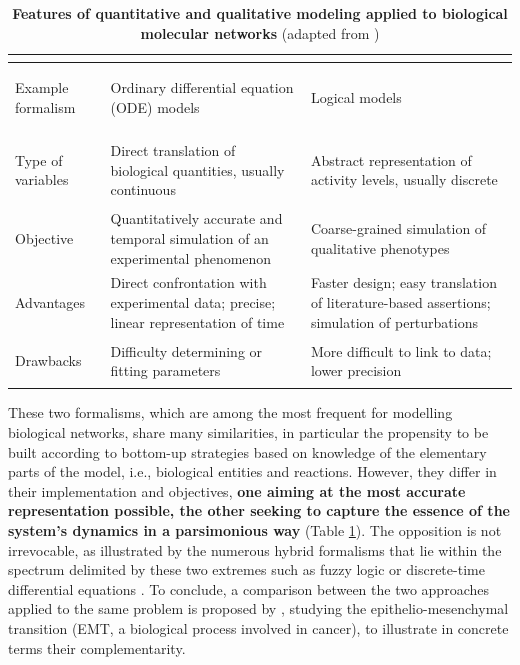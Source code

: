 \documentclass[a4paper,12pt,twoside,onecolumn,openright,final,oldfontcommands]{memoir}
\begin{document}
\begin{table}

\caption{\label{tab:odelogic}\textbf{Features of quantitative and qualitative
modeling applied to biological molecular networks} (adapted from
\citet{le2015quantitative})}
\centering
\begin{tabular}[t]{>{\bfseries\raggedright\arraybackslash}p{6em}||>{\raggedright\arraybackslash}p{12em}|>{\raggedright\arraybackslash}p{12em}}
\hline
\rowcolor[HTML]{808080}  \multicolumn{1}{c}{\textcolor{white}{\textbf{ }}} & \multicolumn{1}{c}{\textcolor{white}{\textbf{Quantitative modeling}}} & \multicolumn{1}{c}{\textcolor{white}{\textbf{Qualitative modeling}}}\\
\hline
Example formalism & Ordinary differential equation (ODE) models & Logical models\\
\hline
Type of variables & Direct translation of biological quantities, usually continuous & Abstract representation of activity levels, usually discrete\\
\hline
Objective & Quantitatively accurate and temporal simulation of an experimental phenomenon & Coarse-grained simulation of qualitative phenotypes\\
\hline
Advantages & Direct confrontation with experimental data; precise; linear representation of time & Faster design; easy translation of literature-based assertions; simulation of perturbations\\
\hline
Drawbacks & Difficulty determining or fitting parameters & More difficult to link to data; lower precision\\
\hline
\end{tabular}
\end{table}





These two formalisms, which are among the most frequent for modelling
biological networks, share many similarities, in particular the
propensity to be built according to bottom-up strategies based on
knowledge of the elementary parts of the model, i.e., biological
entities and reactions. However, they differ in their implementation and
objectives, \textbf{one aiming at the most accurate representation
possible, the other seeking to capture the essence of the system's
dynamics in a parsimonious way} (Table \ref{tab:odelogic}). The
opposition is not irrevocable, as illustrated by the numerous hybrid
formalisms that lie within the spectrum delimited by these two extremes
such as fuzzy logic or discrete-time differential equations
\citep{le2015quantitative, calzone2018logical}. To conclude, a
comparison between the two approaches applied to the same problem is
proposed by \citet{calzone2018logical}, studying the
epithelio-mesenchymal transition (EMT, a biological process involved in
cancer), to illustrate in concrete terms their complementarity.
\end{document}
